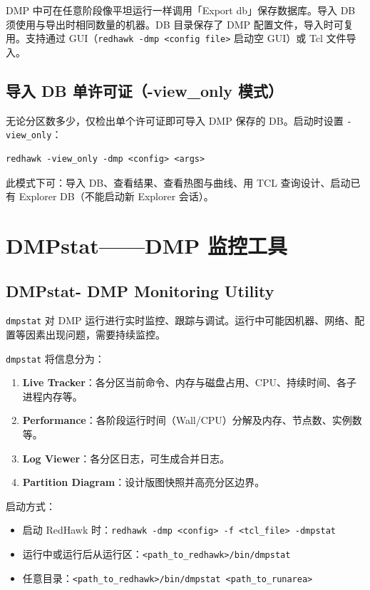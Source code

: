 DMP 中可在任意阶段像平坦运行一样调用「Export db」保存数据库。导入 DB 须使用与导出时相同数量的机器。DB 目录保存了 DMP 配置文件，导入时可复用。支持通过 GUI（\texttt{redhawk -dmp <config file>} 启动空 GUI）或 Tcl 文件导入。

\subsection{导入 DB 单许可证（-view\_only 模式）}
无论分区数多少，仅检出单个许可证即可导入 DMP 保存的 DB。启动时设置 \texttt{-view\_only}：
\begin{lstlisting}
redhawk -view_only -dmp <config> <args>
\end{lstlisting}
此模式下可：导入 DB、查看结果、查看热图与曲线、用 TCL 查询设计、启动已有 Explorer DB（不能启动新 Explorer 会话）。

\section{DMPstat——DMP 监控工具}
\subsection*{DMPstat- DMP Monitoring Utility}

\texttt{dmpstat} 对 DMP 运行进行实时监控、跟踪与调试。运行中可能因机器、网络、配置等因素出现问题，需要持续监控。

\texttt{dmpstat} 将信息分为：
\begin{enumerate}
  \item \textbf{Live Tracker}：各分区当前命令、内存与磁盘占用、CPU、持续时间、各子进程内存等。
  \item \textbf{Performance}：各阶段运行时间（Wall/CPU）分解及内存、节点数、实例数等。
  \item \textbf{Log Viewer}：各分区日志，可生成合并日志。
  \item \textbf{Partition Diagram}：设计版图快照并高亮分区边界。
\end{enumerate}

启动方式：
\begin{itemize}
  \item 启动 RedHawk 时：\texttt{redhawk -dmp <config> -f <tcl\_file> -dmpstat}
  \item 运行中或运行后从运行区：\texttt{<path\_to\_redhawk>/bin/dmpstat}
  \item 任意目录：\texttt{<path\_to\_redhawk>/bin/dmpstat <path\_to\_runarea>}
\end{itemize}

